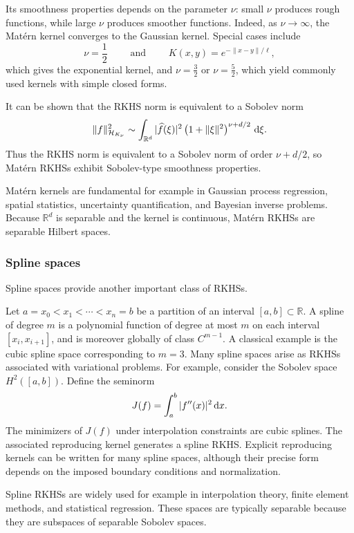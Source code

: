 \documentclass[12pt]{amsart}
\newcommand{\D}[1]{\mbox{\rm #1}}
\newcommand{\dd}{\D{d}}
\numberwithin{equation}{section}
\begin{document}
Its smoothness properties depends on the parameter $\nu$: small $\nu$ produces rough functions, while large $\nu$ produces smoother functions. Indeed, as $\nu\to\infty$, the Mat\'ern kernel converges to the Gaussian kernel. Special cases include 
\[
    \nu=\frac{1}{2}\qquad \text{ and } \qquad K(x,y)=e^{-\|x-y\|/\ell},
\]
which gives the exponential kernel, and $\nu=\frac{3}{2}$ or $\nu=\frac{5}{2}$, which yield commonly used kernels with simple closed forms. 

It can be shown that the RKHS norm is equivalent to a Sobolev norm
\[
    \|f\|_{\mathcal{H}_{K_\nu}}^2 \sim \int_{\mathbb{R}^d} |\widehat{f}(\xi)|^2 \left( 1+\|\xi\|^2 \right)^{\nu+d/2} \,\dd\xi.
\]
Thus the RKHS norm is equivalent to a Sobolev norm of order $\nu+d/2$, so Mat\'ern RKHSs exhibit Sobolev-type smoothness properties.


Mat\'ern kernels are fundamental for example in Gaussian process regression, spatial statistics, uncertainty quantification, and Bayesian inverse problems. 
Because $\mathbb{R}^d$ is separable and the kernel is continuous, Mat\'ern RKHSs are separable Hilbert spaces.

\subsubsection{Spline spaces}

Spline spaces provide another important class of RKHSs.

Let $a=x_0<x_1<\cdots<x_n=b$ be a partition of an interval $[a,b]\subset\mathbb{R}$. 
A spline of degree $m$ is a polynomial function of degree at most $m$ on each interval $[x_i,x_{i+1}]$, and is moreover globally of class $C^{m-1}$.  A classical example is the cubic spline space corresponding to $m=3$. Many spline spaces arise as RKHSs associated with variational problems. For example, consider the Sobolev space $H^2([a,b])$.  Define the seminorm
\[
    J(f) = \int_a^b |f''(x)|^2\,\dd x.
\]
The minimizers of $J(f)$ under interpolation constraints are cubic splines. 
The associated reproducing kernel generates a spline RKHS. 
Explicit reproducing kernels can be written for many spline spaces, although their precise form depends on the imposed boundary conditions and normalization.

Spline RKHSs are widely used for example in interpolation theory, finite element methods, and  statistical regression. 
These spaces are typically separable because they are subspaces of separable Sobolev spaces.


\end{document}
